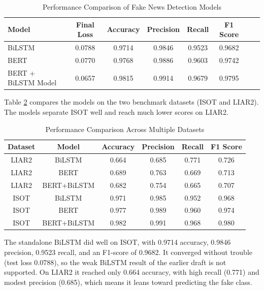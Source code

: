 \documentclass[runningheads]{llncs}
\begin{document}
\begin{table}[h]
\centering
\caption{Performance Comparison of Fake News Detection Models}
\label{tab:comparison}
\small
\begin{tabular}{p{}ccccccp{}}
\hline
 \textbf{Model} & \textbf{Final Loss} & \textbf{Accuracy} & \textbf{Precision} & \textbf{Recall} & \textbf{F1 Score} \\ \hline
 BiLSTM & 0.0788 & 0.9714 & 0.9846 & 0.9523 & 0.9682 \\ 
 BERT & 0.0770 & 0.9768 & 0.9886 & 0.9603 & 0.9742 \\ 
 BERT + BiLSTM Model & 0.0657 & 0.9815 & 0.9914 & 0.9679 & 0.9795 \\ \hline
\end{tabular}
\end{table}

Table \ref{tab:comparison_extended} compares the models on the two benchmark datasets (ISOT and LIAR2). The models separate ISOT well and reach much lower scores on LIAR2.

\begin{table}[h]
\centering
\caption{Performance Comparison Across Multiple Datasets}
\label{tab:comparison_extended}
\small
\begin{tabular}{cccccc}
\hline
\textbf{Dataset} & \textbf{Model} & \textbf{Accuracy} & \textbf{Precision} & \textbf{Recall} & \textbf{F1 Score} \\ \hline
LIAR2 & BiLSTM & 0.664 & 0.685 & 0.771 & 0.726 \\
LIAR2 & BERT & 0.689 & 0.763 & 0.669 & 0.713 \\
LIAR2 & BERT+BiLSTM & 0.682 & 0.754 & 0.665 & 0.707 \\ 
ISOT & BiLSTM & 0.971 & 0.985 & 0.952 & 0.968 \\
ISOT & BERT & 0.977 & 0.989 & 0.960 & 0.974 \\
ISOT & BERT+BiLSTM & 0.982 & 0.991 & 0.968 & 0.980 \\ \hline
\end{tabular}
\end{table}

The standalone BiLSTM did well on ISOT, with 0.9714 accuracy, 0.9846 precision, 0.9523 recall, and an F1-score of 0.9682. It converged without trouble (test loss 0.0788), so the weak BiLSTM result of the earlier draft is not supported. On LIAR2 it reached only 0.664 accuracy, with high recall (0.771) and modest precision (0.685), which means it leans toward predicting the fake class.
\end{document}

